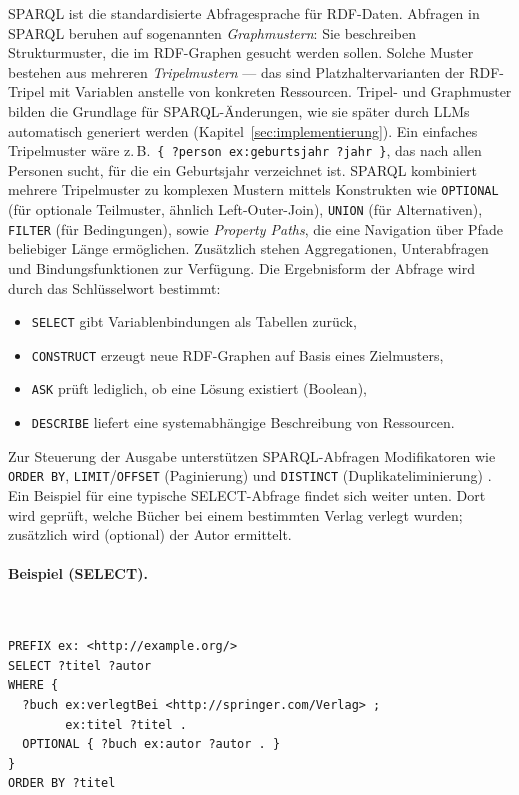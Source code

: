 SPARQL ist die standardisierte Abfragesprache für RDF-Daten. Abfragen in SPARQL beruhen auf sogenannten \emph{Graphmustern}: Sie beschreiben Strukturmuster, die im RDF-Graphen gesucht werden sollen. Solche Muster bestehen aus mehreren \emph{Tripelmustern} — das sind Platzhaltervarianten der RDF-Tripel mit Variablen anstelle von konkreten Ressourcen. Tripel- und Graphmuster bilden die Grundlage für SPARQL-Änderungen, wie sie später durch LLMs automatisch generiert werden (Kapitel~\ref{sec:implementierung}). Ein einfaches Tripelmuster wäre z.\,B.\ \texttt{\{ ?person ex:geburtsjahr ?jahr \}}, das nach allen Personen sucht, für die ein Geburtsjahr verzeichnet ist. SPARQL kombiniert mehrere Tripelmuster zu komplexen Mustern mittels Konstrukten wie \texttt{OPTIONAL} (für optionale Teilmuster, ähnlich Left-Outer-Join), \texttt{UNION} (für Alternativen), \texttt{FILTER} (für Bedingungen), sowie \emph{Property Paths}, die eine Navigation über Pfade beliebiger Länge ermöglichen. Zusätzlich stehen Aggregationen, Unterabfragen und Bindungsfunktionen zur Verfügung.
Die Ergebnisform der Abfrage wird durch das Schlüsselwort bestimmt:
\begin{itemize}
  \item \texttt{SELECT} gibt Variablenbindungen als Tabellen zurück,
  \item \texttt{CONSTRUCT} erzeugt neue RDF-Graphen auf Basis eines Zielmusters,
  \item \texttt{ASK} prüft lediglich, ob eine Lösung existiert (Boolean),
  \item \texttt{DESCRIBE} liefert eine systemabhängige Beschreibung von Ressourcen.
\end{itemize}
Zur Steuerung der Ausgabe unterstützen SPARQL-Abfragen Modifikatoren wie \texttt{ORDER BY}, \texttt{LIMIT}/\texttt{OFFSET} (Paginierung) und \texttt{DISTINCT} (Duplikateliminierung) \cite{SPARQL11Overview,Hitzler,AntoniouVanHarmelen}.
Ein Beispiel für eine typische SELECT-Abfrage findet sich weiter unten. Dort wird geprüft, welche Bücher bei einem bestimmten Verlag verlegt wurden; zusätzlich wird (optional) der Autor ermittelt.


\paragraph{Beispiel (SELECT).}\mbox{}\\[-1.5ex]
\begin{lstlisting}
PREFIX ex: <http://example.org/>
SELECT ?titel ?autor
WHERE {
  ?buch ex:verlegtBei <http://springer.com/Verlag> ;
        ex:titel ?titel .
  OPTIONAL { ?buch ex:autor ?autor . }
}
ORDER BY ?titel
\end{lstlisting}

